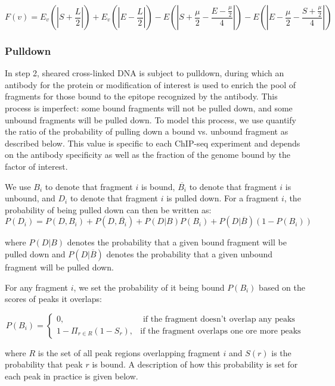 \documentclass[12pt]{article}
\begin{document}
\begin{equation}
F(v) = E_v(|S + \frac{L}{2}|) + E_v(|E - \frac{L}{2}|) - E(|S + \frac{\mu}{2} - \frac{E- \frac{\mu}{2}}{4}|) - E(|E- \frac{\mu}{2} - \frac{S + \frac{\mu}{2}}{4}|)
\end{equation}

\subsubsection*{Pulldown}
In step 2, sheared cross-linked DNA is subject to pulldown, during which an antibody for the protein or modification of interest is used to enrich the pool of fragments for those bound to the epitope recognized by the antibody.
This process is imperfect: some bound fragments will not be pulled down, and some unbound fragments will be pulled down.
To model this process, we use quantify the ratio of the probability of pulling down a bound vs. unbound fragment as described below.
This value is specific to each ChIP-seq experiment and depends on the antibody specificity as well as the fraction of the genome bound by the factor of interest.

We use $B_i$ to denote that fragment $i$ is bound, $\overline{B_i}$ to denote that fragment $i$ is unbound, and $D_i$ to denote that fragment $i$ is pulled down. For a fragment $i$, the probability of being pulled down can then be written as:
\begin{equation} \label{eq:pulldown}
  P(D_i) = P(D, B_i) + P(D, \overline{B_i}) + P(D|B)P(B_i) + P(D|\overline{B})(1-P(B_i))
\end{equation}

where $P(D|B)$ denotes the probability that a given bound fragment will be pulled down and $P(D|\overline{B})$ denotes the probability that a given unbound fragment will be pulled down.

For any fragment $i$, we set the probability of it being bound $P(B_i)$ based on the scores of peaks it overlaps:

\begin{equation}
  P(B_i) = \begin{cases}
    0, & \text{ if the fragment doesn't overlap any peaks} \\
    1-\Pi_{r \in R} (1-S_r), & \text {if the fragment overlaps one ore more peaks}
    \end{cases}
\end{equation}

where $R$ is the set of all peak regions overlapping fragment $i$ and $S(r)$ is the probability that peak $r$ is bound. A description of how this probability is set for each peak in practice is given below.
\end{document}

